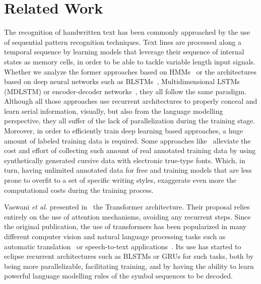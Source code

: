 \documentclass[10pt,twocolumn,letterpaper]{article}
\begin{document}
\section{Related Work}

The recognition of handwritten text has been commonly approached by the use of sequential pattern recognition techniques. Text lines are processed along a temporal sequence by learning models that leverage their sequence of internal states as memory cells, in order to be able to tackle variable length input signals. Whether we analyze the former approaches based on HMMs~\cite{bianne2011dynamic,espana2010improving,gimenez2014handwriting} or the architectures based on deep neural networks such as BLSTMs~\cite{graves2008novel},  Multidimensional LSTMs~\cite{graves2009offline,puigcerver2017multidimensional} (MDLSTM) or encoder-decoder networks~\cite{bluche2016joint,kang2018convolve,sueiras2018offline,chowdhury2018efficient,michael2019evaluating}, they all follow the same paradigm. Although all those approaches use recurrent architectures to properly conceal and learn serial information, visually, but also from the language modelling perspective, they all suffer of the lack of parallelization during the training stage. Moreover, in order to efficiently train deep learning based approaches, a huge amount of labeled training data is required. Some approaches like~\cite{bhunia2019handwriting,gurjar2018learning,krishnan2019hwnet} alleviate the cost and effort of collecting such amount of real annotated training data by using synthetically generated cursive data with electronic true-type fonts. Which, in turn, having unlimited annotated data for free and training models that are less prone to overfit to a set of specific writing styles, exaggerate even more the computational costs during the training process.

Vaswani \emph{et al.} presented in~\cite{vaswani2017attention} the Transformer architecture. Their proposal relies entirely on the use of attention mechanisms, avoiding any recurrent steps. Since the original publication, the use of transformers has been popularized in many different computer vision and natural language processing tasks such as automatic translation~\cite{devlin2018bert} or speech-to-text applications~\cite{dong2018speech}. Its use has started to eclipse recurrent architectures such as BLSTMs or GRUs for such tasks, both by being more parallelizable, facilitating training, and by having the ability to learn powerful language modelling rules of the symbol sequences to be decoded.
\end{document}
